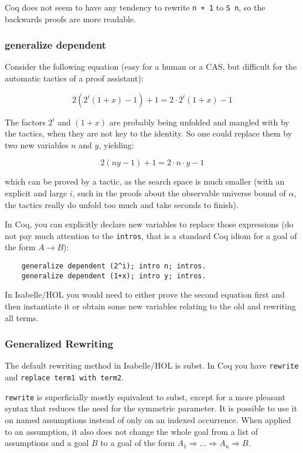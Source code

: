 \documentclass[headsepline,footsepline,footinclude=false,oneside,fontsize=11pt,paper=a4,listof=totoc,bibliography=totoc]{scrbook} %
\begin{document}
Coq does not seem to have any tendency to rewrite \verb|n + 1| to \verb|S n|, so the backwards proofs are more readable.

\subsubsection{generalize dependent}

Consider the following equation (easy for a human or a CAS, but difficult for the automatic tactics of a proof assistant):

\begin{equation*}
	2 (2 ^ i  (1 + x) - 1) + 1 = 2 \cdot 2 ^ i(1 + x) - 1
\end{equation*}

The factors $2^i$ and $(1+x)$ are probably being unfolded and mangled with by the tactics, when they are not key to the identity. So one could replace them by two new variables $n$ and $y$, yielding:

\begin{equation*}
2 (ny - 1) + 1 = 2 \cdot n \cdot y - 1
\end{equation*}

which can be proved by a tactic, as the search space is much smaller (with an explicit and large $i$, such in the proofs about the observable universe bound of $\alpha$, the tactics really do unfold too much and take seconds to finish).

In Coq, you can explicitly declare new variables to replace those expressions (do not pay much attention to the \verb|intros|, that is a standard Coq idiom for a goal of the form $A \longrightarrow B$):

\begin{lstlisting}
	generalize dependent (2^i); intro n; intros.
	generalize dependent (1+x); intro y; intros.
\end{lstlisting}

In Isabelle/HOL you would need to either prove the second equation first and then instantiate it or obtain some new variables relating to the old and rewriting all terms.

\subsubsection{Generalized Rewriting}

The default rewriting method in Isabelle/HOL is subst. In Coq you have \verb|rewrite| and \verb|replace term1 with term2|. 

\verb|rewrite| is superficially mostly equivalent to subst, except for a more pleasant syntax that reduces the need for the symmetric parameter. It is possible to use it on named assumptions instead of only on an indexed occurrence. When applied to an assumption, it also does not change the whole goal from a list of assumptions and a goal $B$ to a goal of the form $A_1 \Longrightarrow \dots \Longrightarrow A_n \Longrightarrow B$.
\end{document}
